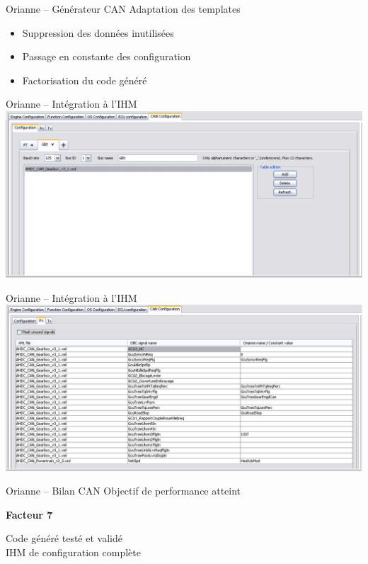 \documentclass[xcolor=x11names,compress]{beamer}
\begin{document}
\begin{frame}{Orianne -- Générateur CAN}
  Adaptation des templates
  \begin{itemize}
	\item Suppression des données inutilisées
	\item Passage en constante des configuration
	\item Factorisation du code généré
  \end{itemize}
\end{frame}

\begin{frame}{Orianne -- Intégration à l'IHM}
  \centering
  \includegraphics[scale=0.3]{images/ihmcan_conf}
\end{frame}

\begin{frame}{Orianne -- Intégration à l'IHM}
  \centering
  \includegraphics[scale=0.3]{images/ihmcan_signal}
\end{frame}

\begin{frame}{Orianne -- Bilan CAN}
  Objectif de performance atteint
  \begin{center}
	{\large {\bf Facteur 7}}
  \end{center}
  Code généré testé et validé\\
  \vfill
  IHM de configuration complète
\end{frame}
\end{document}
